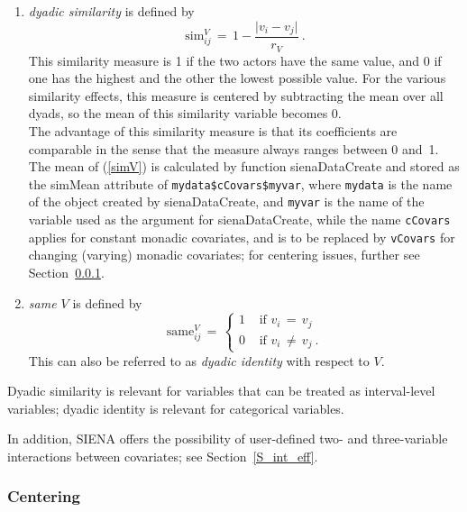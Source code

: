 \documentclass[a4paper,fleqn,11pt]{article}
\newcommand{\+}{\, + \,}
\newcommand{\sfn}[1]{\textsf{#1}}
\newcommand{\SI}{{\sf SIENA }}
\begin{document}
\begin{enumerate}
\item \emph{dyadic similarity} is defined by
\begin{equation}
 \text{sim}^V_{ij} \,=\, 1 - \frac{ \vert v_i - v_j \vert }{ r_V } \ .
            \label{simV}
\end{equation}
      This similarity measure is 1 if
      the two actors have the same value, and 0 if one has the highest and the
      other the lowest possible value.
      For the various similarity effects, this measure
      is centered by subtracting the mean over all dyads,
      so the mean of this similarity variable becomes 0.    \\
      The advantage of this similarity measure is that its coefficients
      are comparable in the sense that the measure always ranges
      between 0 and~1.  \\
      The mean of (\ref{simV}) is calculated by function
      \sfn{sienaDataCreate} and stored as the \sfn{simMean} attribute
      of \texttt{mydata\$cCovars\$myvar}, where \texttt{mydata} is the name
      of the object created by \sfn{sienaDataCreate}, and \texttt{myvar}
      is the name of the variable used as the argument for
      \sfn{sienaDataCreate}, while the name \texttt{cCovars} applies for
      constant monadic covariates, and is to be replaced by \texttt{vCovars}
      for changing (varying) monadic covariates;
      for centering issues, further see Section~\ref{S_center}.
\item \emph{same $V$} is defined by
\begin{equation}
 \text{same}^V_{ij} \,=\,
        \left\{ \begin{array}{ll} 1 & \text{ if } v_i \,=\, v_j \\
                          0 & \text{ if } v_i \,\neq\, v_j \ .
    \end{array} \right.
\end{equation}
      This can also be referred to as \emph{dyadic identity}
      with respect to $V$.
\end{enumerate}
Dyadic similarity is relevant for variables that can be treated as
interval-level variables; dyadic identity is relevant for categorical variables.

In addition, \SI offers the possibility of user-defined two- and three-variable
interactions between covariates; see Section~\ref{S_int_eff}.


\subsubsection{Centering}
\label{S_center}
\end{document}
